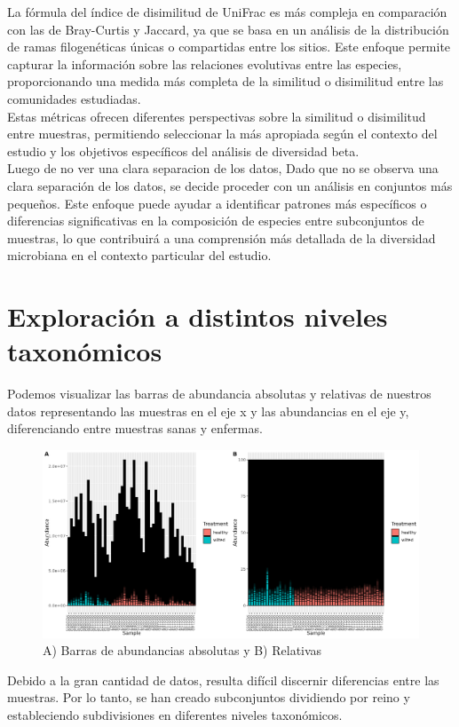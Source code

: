 La fórmula del índice de disimilitud de UniFrac es más compleja en comparación con las de Bray-Curtis y Jaccard, ya que se basa en un análisis de la distribución de ramas filogenéticas únicas o compartidas entre los sitios. Este enfoque permite capturar la información sobre las relaciones evolutivas entre las especies, proporcionando una medida más completa de la similitud o disimilitud entre las comunidades estudiadas. \\

Estas métricas ofrecen diferentes perspectivas sobre la similitud o disimilitud entre muestras, permitiendo seleccionar la más apropiada según el contexto del estudio y los objetivos específicos del análisis de diversidad beta.\\

Luego de no ver una clara separacion de los datos, Dado que no se observa una clara separación de los datos, se decide proceder con un análisis en conjuntos más pequeños. Este enfoque puede ayudar a identificar patrones más específicos o diferencias significativas en la composición de especies entre subconjuntos de muestras, lo que contribuirá a una comprensión más detallada de la diversidad microbiana en el contexto particular del estudio.\\

\section{Exploración a distintos niveles taxonómicos}
Podemos visualizar las barras de abundancia absolutas y relativas de nuestros datos representando las muestras en el eje x y las abundancias en el eje y, diferenciando entre muestras sanas y enfermas.\\
\begin{figure}[h]
\centering
\includegraphics[width=\textwidth]{Img/cap2/Barras.png}
\caption{A) Barras de abundancias absolutas y B) Relativas}
\end{figure}
Debido a la gran cantidad de datos, resulta difícil discernir diferencias entre las muestras. Por lo tanto, se han creado subconjuntos dividiendo por reino y estableciendo subdivisiones en diferentes niveles taxonómicos.\\

